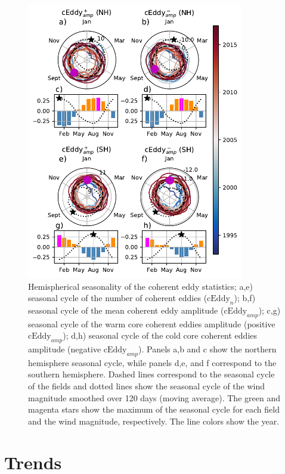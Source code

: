 \documentclass[draft,linenumbers]{agujournal2019}
\newcommand{\cEddy}{\textrm{cEddy}}
\begin{document}
	\begin{figure}
	    \centering
	    \includegraphics[width=95mm]{figures/All_polar_plots_eddy_stats_polarity_V4.pdf}
	    \caption{Hemispherical seasonality of the coherent eddy statistics;
		a,e) seasonal cycle of the number of coherent eddies ($\cEddy_n$); b,f) seasonal cycle of the mean coherent eddy amplitude ($\cEddy_{amp}$); c,g) seasonal cycle of the warm core coherent eddies amplitude (positive $\cEddy_{amp}$); d,h) seasonal cycle of the cold core coherent eddies amplitude (negative $\cEddy_{amp}$). Panels a,b and c show the northern hemisphere seasonal cycle, while panels d,e, and f correspond to the southern hemisphere. Dashed lines correspond to the seasonal cycle of the fields and dotted lines show the seasonal cycle of the wind magnitude smoothed over 120 days (moving average). The green and magenta stars show the maximum of the seasonal cycle for each field and the wind magnitude, respectively. The line colors show the year.}
	    \label{fig:eddy_stats_polar}
	\end{figure}

	\section{Trends}
	\label{sec:CE_trends}	
	
\end{document}
